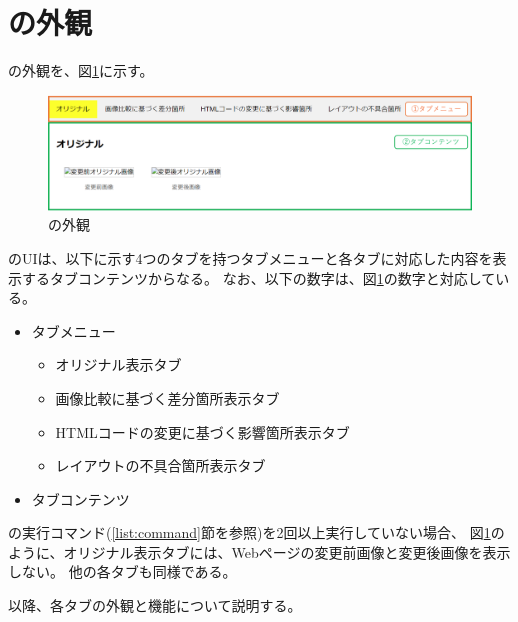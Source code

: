 \section{\toolName の外観}\label{sec:MixVRT_Appearance}
\toolName の外観を、図\ref{fig: Appearance}に示す。
\begin{figure}[tp]
    \begin{center}
        \includegraphics[width=1.0\columnwidth]{image/3_Appearance3.png}
        \caption{\toolName の外観}
        \label{fig: Appearance}
    \end{center}
\end{figure}
\toolName のUIは、以下に示す4つのタブを持つタブメニューと各タブに対応した内容を表示するタブコンテンツからなる。
なお、以下の数字は、図\ref{fig: Appearance}の数字と対応している。
\begin{itemize}
    \item[①] タブメニュー
          \begin{itemize}
              \item オリジナル表示タブ
              \item 画像比較に基づく差分箇所表示タブ
              \item HTMLコードの変更に基づく影響箇所表示タブ
              \item レイアウトの不具合箇所表示タブ
          \end{itemize}
    \item[②] タブコンテンツ
\end{itemize}
\par
\toolName の実行コマンド(\ref{list:command}節を参照)を2回以上実行していない場合、
図\ref{fig: Appearance}のように、オリジナル表示タブには、Webページの変更前画像と変更後画像を表示しない。
他の各タブも同様である。
\par
以降、各タブの外観と機能について説明する。

